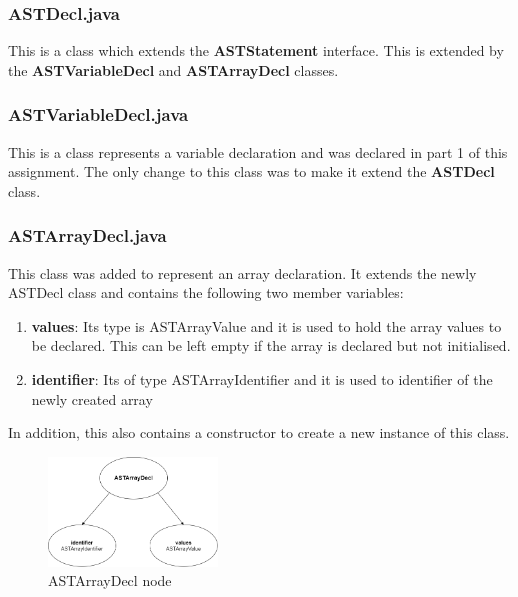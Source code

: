 \documentclass{article}
\begin{document}
										\subsubsection{ASTDecl.java}
					
					This is a class which extends the \textbf{ASTStatement} interface. This is extended by the \textbf{ASTVariableDecl} and \textbf{ASTArrayDecl} classes.
					
										\subsubsection{ASTVariableDecl.java}
					
					This is a class represents a variable declaration and was declared in part 1 of this assignment. The only change to this class was to make it extend the \textbf{ASTDecl} class.
					
					\subsubsection{ASTArrayDecl.java}
					
					This class was added to represent an array declaration. It extends the newly ASTDecl class and contains the following two member variables:
					
					\begin{enumerate}
					\item \textbf{values}: Its type is ASTArrayValue and it is used to hold the array values to be declared. This can be left empty if the array is declared but not initialised.
					\item \textbf{identifier}: Its of type ASTArrayIdentifier and it is used to identifier of the newly created array
				
					\end{enumerate}
			In addition, this also contains a constructor to create a new instance of this class.
			
							\begin{figure}[H]
					\centering
			 			\includegraphics[width=0.4\textwidth]{arraydecl.png}
			  			\caption{ASTArrayDecl node}
			  			\label{fig:astarraydecl}
					\end{figure}
					
\end{document}
